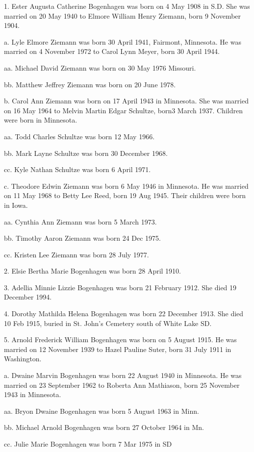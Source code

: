 \documentclass[a4paper]{article}
\begin{document}
1. Ester Augusta Catherine Bogenhagen was born on 4 May 1908 in S.D. She was married on 20 May 1940 to Elmore William Henry Ziemann, born 9 November 1904.

a. Lyle Elmore Ziemann was born 30 April 1941, Fairmont, Minnesota. He was married on 4 November 1972 to Carol Lynn Meyer, born 30 April 1944.

aa. Michael David Ziemann was born on 30 May 1976 Missouri.

bb. Matthew Jeffrey Ziemann was born on 20 June 1978.

b. Carol Ann Ziemann was born on 17 April 1943 in Minnesota.  She was married on 16 May 1964 to Melvin Martin Edgar Schultze, born3 March 1937.  Children were born in Minnesota.

aa. Todd Charles Schultze was born 12 May 1966.

bb. Mark Layne Schultze was born 30 December 1968.

cc. Kyle Nathan Schultze was born 6 April 1971.

c. Theodore Edwin Ziemann was born 6 May 1946 in Minnesota.  He was married on 11 May 1968 to Betty Lee Reed, born 19 Aug 1945. Their children were born in Iowa.

aa. Cynthia Ann Ziemann was born 5 March 1973.

bb. Timothy Aaron Ziemann was born 24 Dec 1975.

cc. Kristen Lee Ziemann was born 28 July 1977.

2. Elsie Bertha Marie Bogenhagen was born 28 April 1910.

3. Adellia Minnie Lizzie Bogenhagen was born 21 February 1912.  She died 19 December 1994.

4. Dorothy Mathilda Helena Bogenhagen was born 22 December 1913.  She died 10 Feb 1915, buried in St. John's Cemetery south of White Lake SD.

5. Arnold Frederick William Bogenhagen was born on 5 August 1915.  He was married on 12 November 1939 to Hazel Pauline Suter, born 31 July 1911 in Washington. 
		
a. Dwaine Marvin Bogenhagen was born 22 August 1940 in Minnesota. He was married on 23 September 1962 to Roberta Ann Mathiason, born 25 November 1943 in Minnesota. 

aa. Bryon Dwaine Bogenhagen was born 5 August 1963 in Minn.

bb. Michael Arnold Bogenhagen was born 27 October 1964 in Mn.

cc. Julie Marie Bogenhagen was born 7 Mar 1975 in SD
\end{document}
